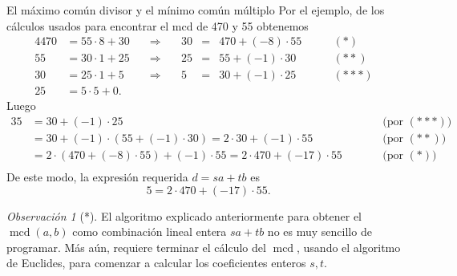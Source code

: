 \documentclass[11pt,spanish,makeidx]{amsbook}
\theoremstyle{definition}
\theoremstyle{remark}
\newtheorem{observacion}{Observaci\'on}[section]
\newcommand \mcd{\operatorname{mcd}}
\begin{document}
\begin{section}{El máximo común divisor y el mínimo común múltiplo}
Por el ejemplo, de los cálculos usados para encontrar el mcd de 470 y 55 obtenemos
\begin{alignat*}4
	470&=55 \cdot 8 +30&\quad\Rightarrow\quad &30 &=&470 + (-8)\cdot 55&\qquad (*)&\\
	55&=30 \cdot 1 + 25&\quad\Rightarrow\quad &25 &=&55 +(-1)\cdot 30&\qquad (**)&\\
	30&=25 \cdot 1+5&\quad\Rightarrow\quad &5 &=&30 +(-1) \cdot 25&\qquad (***)& \\
	25&=5\cdot 5+0.&&&&&&
\end{alignat*}
Luego
\begin{alignat*}3
	5 &= 30 +(-1) \cdot 25& &\qquad \text{(por $(***)$)} && \\
	  &= 30 + (-1) \cdot (55 +(-1)\cdot 30) = 2 \cdot 30 + (-1) \cdot 55& &\qquad \text{(por $(**)$)}&& \\   
	  &=  2 \cdot (470 + (-8)\cdot 55) + (-1) \cdot 55 = 2 \cdot 470 +(-17)\cdot 55& &\qquad \text{(por $(*)$)}&&\\    
\end{alignat*}
De este modo, la expresión requerida $d=sa+tb$ es
$$
5=2 \cdot 470 +(-17)\cdot 55.
$$

\begin{observacion}[*]
El  algoritmo explicado anteriormente para obtener el $\mcd(a,b)$ como combinación lineal entera $sa+tb$ no es muy sencillo de programar. Más aún, requiere terminar el cálculo del $\mcd$, usando el algoritmo de Euclides, para comenzar a calcular los coeficientes enteros $s,t$. 


\end{observacion}
\end{section}
\end{document}
